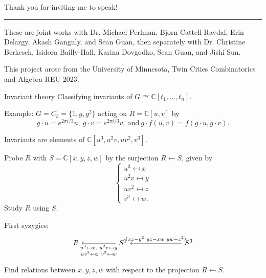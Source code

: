 \documentclass[mathserif
, handout
]{beamer}
\title
{\color{black!85}{Free and Virtual Resolutions}}
\subtitle{Undergraduate Mathematics Research Symposium 2024}
\author[Sai Sivakumar]
{Sai Sivakumar}
\institute[Georgia Tech]{\color{blue!40!palettelight}{University of Florida}}
\date{26 April 2024}
\begin{document}
\frame{\titlepage}

\begin{frame}{}{}
{\color{blue!40!palettelight}Thank you for inviting me to speak!}
\vspace{0.75pc}
\hrule
\vspace{0.75pc}
These are joint works with Dr. Michael Perlman, Bjorn Cattell-Ravdal, Erin Delargy, Akash Ganguly, and Sean Guan,
then separately with Dr. Christine Berkesch, Isidora Bailly-Hall, Karina Dovgodko, Sean Guan, and Jishi Sun.

\vspace{0.75pc}
This project arose from the University of Minnesota, Twin Cities Combinatorics and Algebra REU 2023. 
\end{frame}

\begin{frame}{Invariant theory}
    Classifying invariants of $G\curvearrowright \mathbb C[t_1,\dots,t_n]$.

    Example: $G = C_3 = \{1,g,g^2\}$ acting on $R = \mathbb C[u,v]$ by \[g\cdot u = e^{2\pi i /3}u,~ g\cdot v = e^{2\pi i /3}v,~ \text{and} ~ g\cdot f(u,v) = f(g\cdot u,g\cdot v).\]
    
    Invariants are elements of $\mathbb C[u^3,u^2v,uv^2,v^3]$.
\end{frame}

\begin{frame}
    Probe $R$ with $S = \mathbb C[x,y,z,w]$ by the surjection $R\leftarrow S$, given by
    \[\begin{cases}
        u^3 \mapsfrom x \\
        u^2v \mapsfrom y \\
        uv^2 \mapsfrom z \\
        v^3 \mapsfrom w .
    \end{cases}\]
    Study $R$ using $S$.
\end{frame}

\begin{frame}
    First syzygies:
\[\begin{tikzcd}[ampersand replacement=\&]
	R \&\& {S^1} \&\&\& {S^3}
	\arrow["{\substack{u^3 \mapsfrom x, ~u^2v \mapsfrom y\\ uv^2 \mapsfrom z ~v^3 \mapsfrom w}}", from=1-3, to=1-1]
	\arrow["{(\!\begin{smallmatrix}xz-y^2 & yz-xw & yw-z^2\end{smallmatrix}\!)}"', from=1-6, to=1-3]
\end{tikzcd}\]

Find relations between $x,y,z,w$ with respect to the projection $R\leftarrow S$.
\end{frame}
\end{document}
